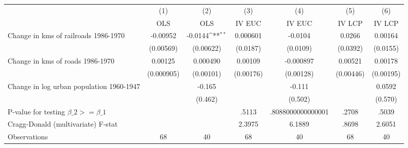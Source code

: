 {
\def\sym#1{\ifmmode^{#1}\else\(^{#1}\)\fi}
\begin{tabular}{l*{6}{c}}
\hline\hline
                &\multicolumn{1}{c}{(1)}&\multicolumn{1}{c}{(2)}&\multicolumn{1}{c}{(3)}&\multicolumn{1}{c}{(4)}&\multicolumn{1}{c}{(5)}&\multicolumn{1}{c}{(6)}\\
                &\multicolumn{1}{c}{OLS}&\multicolumn{1}{c}{OLS}&\multicolumn{1}{c}{IV EUC}&\multicolumn{1}{c}{IV EUC}&\multicolumn{1}{c}{IV LCP}&\multicolumn{1}{c}{IV LCP}\\
\hline
Change in kms of railroads 1986-1970& -0.00952         &  -0.0144\sym{**} & 0.000601         &  -0.0104         &   0.0266         &  0.00164         \\
                &(0.00569)         &(0.00622)         & (0.0187)         & (0.0109)         & (0.0392)         & (0.0155)         \\
[1em]
Change in kms of roads 1986-1970&  0.00125         & 0.000490         &  0.00109         &-0.000897         &  0.00521         &  0.00178         \\
                &(0.000905)         &(0.00101)         &(0.00176)         &(0.00128)         &(0.00446)         &(0.00195)         \\
[1em]
Change in log urban population 1960-1947&                  &   -0.165         &                  &   -0.111         &                  &   0.0592         \\
                &                  &  (0.462)         &                  &  (0.502)         &                  &  (0.570)         \\
\hline
P-value for testing $\beta\_{2} >= \beta\_{1}$&                  &                  &    .5113         &.8088000000000001         &    .2708         &    .5039         \\
Cragg-Donald (multivariate) F-stat&                  &                  &   2.3975         &   6.1889         &    .8698         &   2.6051         \\
Observations    &       68         &       40         &       68         &       40         &       68         &       40         \\
\hline\hline
\end{tabular}
}
